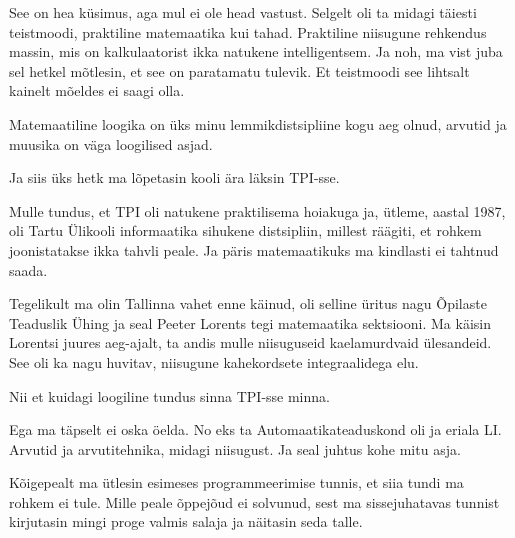 
See on hea küsimus, aga mul ei ole head vastust. Selgelt oli ta midagi täiesti teistmoodi, praktiline matemaatika kui tahad. Praktiline niisugune rehkendus massin, mis on  kalkulaatorist ikka  natukene intelligentsem. Ja noh, ma vist juba sel hetkel mõtlesin, et see on paratamatu tulevik. Et teistmoodi see  lihtsalt kainelt mõeldes ei saagi olla. 


Matemaatiline loogika on üks  minu lemmikdistsipliine kogu aeg olnud, arvutid  ja muusika  on väga loogilised asjad. 

Ja siis üks hetk ma lõpetasin kooli ära läksin TPI-sse.


Mulle tundus, et TPI oli natukene praktilisema hoiakuga ja, ütleme, aastal 1987, oli Tartu Ülikooli informaatika  sihukene distsipliin, millest räägiti, et rohkem joonistatakse ikka tahvli peale. Ja päris matemaatikuks ma kindlasti ei tahtnud saada.

Tegelikult ma olin Tallinna vahet enne käinud, oli selline üritus nagu Õpilaste Teaduslik Ühing ja seal  Peeter Lorents tegi matemaatika sektsiooni. Ma käisin Lorentsi juures aeg-ajalt,  ta andis mulle niisuguseid kaelamurdvaid ülesandeid. See oli ka nagu huvitav,  niisugune kahekordsete integraalidega elu. 

Nii et kuidagi loogiline tundus sinna TPI-sse minna.


Ega ma täpselt ei oska öelda. No eks ta  Automaatikateaduskond oli ja eriala LI. Arvutid ja arvutitehnika, midagi niisugust. Ja seal juhtus kohe  mitu asja. 

Kõigepealt ma ütlesin esimeses programmeerimise tunnis, et siia tundi ma rohkem ei tule. Mille peale õppejõud ei solvunud, sest ma sissejuhatavas tunnist kirjutasin mingi proge valmis salaja ja näitasin seda talle.

